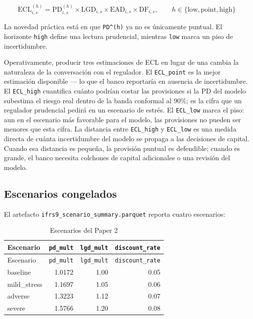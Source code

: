 \documentclass[
  spanish,
  11pt,
  letterpaper,
]{scrbook}
\theoremstyle{plain}
\theoremstyle{remark}
\begin{document}
\[
\mathrm{ECL}_{i,s}^{(h)}=\mathrm{PD}_{i,s}^{(h)}\times \mathrm{LGD}_{i,s}\times \mathrm{EAD}_{i,s}\times \mathrm{DF}_{i,s},
\qquad h \in \{\text{low},\text{point},\text{high}\}
\]

La novedad práctica está en que \texttt{PD\^{}(h)} ya no es únicamente
puntual. El horizonte \texttt{high} define una lectura prudencial,
mientras \texttt{low} marca un piso de incertidumbre.

Operativamente, producir tres estimaciones de ECL en lugar de una cambia
la naturaleza de la conversación con el regulador. El
\texttt{ECL\_point} es la mejor estimación disponible --- lo que el
banco reportaría en ausencia de incertidumbre. El \texttt{ECL\_high}
cuantifica cuánto podrían costar las provisiones si la PD del modelo
subestima el riesgo real dentro de la banda conformal al 90\%; es la
cifra que un regulador prudencial pedirá en un escenario de estrés. El
\texttt{ECL\_low} marca el piso: aun en el escenario más favorable para
el modelo, las provisiones no pueden ser menores que esta cifra. La
distancia entre \texttt{ECL\_high} y \texttt{ECL\_low} es una medida
directa de cuánta incertidumbre del modelo se propaga a las decisiones
de capital. Cuando esa distancia es pequeña, la provisión puntual es
defendible; cuando es grande, el banco necesita colchones de capital
adicionales o una revisión del modelo.

\subsection{Escenarios congelados}\label{escenarios-congelados}

El artefacto \texttt{ifrs9\_scenario\_summary.parquet} reporta cuatro
escenarios:

\begin{longtable}[]{@{}lrrr@{}}
\caption{Escenarios del Paper 2}\label{tbl-p2-scenarios}\tabularnewline
\toprule\noalign{}
Escenario & \texttt{pd\_mult} & \texttt{lgd\_mult} &
\texttt{discount\_rate} \\
\midrule\noalign{}
\endfirsthead
\toprule\noalign{}
Escenario & \texttt{pd\_mult} & \texttt{lgd\_mult} &
\texttt{discount\_rate} \\
\midrule\noalign{}
\endhead
\bottomrule\noalign{}
\endlastfoot
baseline & 1.0172 & 1.00 & 0.05 \\
mild\_stress & 1.1697 & 1.05 & 0.06 \\
adverse & 1.3223 & 1.12 & 0.07 \\
severe & 1.5766 & 1.20 & 0.08 \\
\end{longtable}
\end{document}
